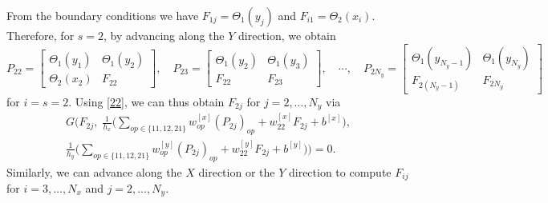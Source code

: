 \documentclass[pdflatex,sn-mathphys-num]{sn-jnl}%
\theoremstyle{thmstyleone}%
\theoremstyle{thmstyletwo}%
\theoremstyle{thmstylethree}%
\begin{document}
{From the boundary conditions we have
$F_{1j}=\Theta_1(y_j)$ and
$F_{i1}=\Theta_2({x_i})$. Therefore, for $s=2$,
by advancing along the $Y$ direction, we obtain
\[
P_{22}=
\begin{bmatrix}
\Theta_1(y_1) & \Theta_1(y_2) \\
\Theta_2({x_2}) & F_{22}
\end{bmatrix},\quad
P_{23}=
\begin{bmatrix}
\Theta_1(y_2) & \Theta_1(y_3) \\
F_{22}& F_{23}
\end{bmatrix},
\quad \cdots, \quad
P_{2N_y}=
\begin{bmatrix}
\Theta_1(y_{N_y-1}) & \Theta_1(y_{N_y}) \\
F_{2(N_y-1)}& F_{2N_y}
\end{bmatrix}
\]
for $i=s=2$. Using \eqref{22}, we can thus obtain $F_{2j}$ for $j=2,\ldots,N_y$ via
\begin{equation}
\begin{split}
G\Biggl(
F_{2j},\;
\frac{1}{h_x}\biggl(\sum_{op\in\{11,12,21\}} w_{op}^{[x]}(P_{2j})_{op}+w_{22}^{[x]}F_{2j}+b^{[x]}\biggr),\\
\frac{1}{h_y}\biggl(\sum_{op\in\{11,12,21\}} w_{op}^{[y]}(P_{2j})_{op}+w_{22}^{[y]}F_{2j}+b^{[y]}\biggr)
\Biggr)=0.
\end{split}
\end{equation}
Similarly, we can advance along the $X$ direction or the $Y$ direction to compute $F_{ij}$ for $i=3,\ldots,N_x$ and $j=2,\ldots,N_y$.

}
\end{document}
